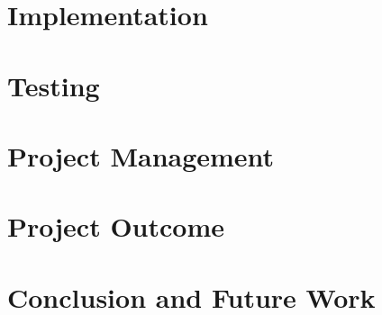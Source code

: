 \documentclass[12pt, a4paper, twoside]{book}
\begin{document}
\chapter{Implementation}
\label{chp:implementation}


\chapter{Testing}
\label{chp:testing}


\chapter{Project Management}
\label{chp:project_management}


\chapter{Project Outcome}
% 

\chapter{Conclusion and Future Work}
\label{chp:conclusions_further_work}


\pagestyle{empty}

\appendix


\backmatter

\printbibliography
{}
\end{document}
